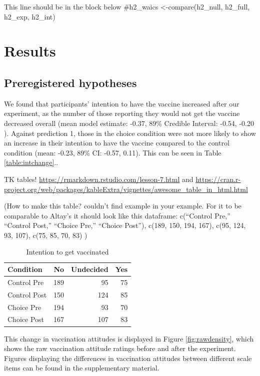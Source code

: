 \documentclass[
  english,
  ,jou,floatsintext]{apa6}
\begin{document}
This line should be in the block below \#h2\_waics \textless-compare(h2\_null, h2\_full, h2\_exp, h2\_int)

\hypertarget{results}{%
\section{Results}\label{results}}

\hypertarget{preregistered-hypotheses-1}{%
\subsection{Preregistered hypotheses}\label{preregistered-hypotheses-1}}

We found that participants' intention to have the vaccine increased after our experiment, as the number of those reporting they would not get the vaccine decreased overall (mean model estimate: -0.37, 89\% Credible Interval: -0.54, -0.20 ). Against prediction 1, those in the choice condition were not more likely to show an increase in their intention to have the vaccine compared to the control condition (mean: -0.23, 89\% CI: -0.57, 0.11). This can be seen in Table \ref{table:intchange}..

TK tables! \url{https://rmarkdown.rstudio.com/lesson-7.html} and \url{https://cran.r-project.org/web/packages/kableExtra/vignettes/awesome_table_in_html.html}

(How to make this table? couldn't find example in your example. For it to be comparable to Altay's it should look like this dataframe: c(``Control Pre,'' ``Control Post,'' ``Choice Pre,'' ``Choice Post''), c(189, 150, 194, 167), c(95, 124, 93, 107), c(75, 85, 70, 83) )

\begin{table}

\caption{\label{tab:intchange}Intention to get vaccinated}
\centering
\begin{tabular}[t]{l|r|r|r}
\hline
Condition & No & Undecided & Yes\\
\hline
Control Pre & 189 & 95 & 75\\
\hline
Control Post & 150 & 124 & 85\\
\hline
Choice Pre & 194 & 93 & 70\\
\hline
Choice Post & 167 & 107 & 83\\
\hline
\end{tabular}
\end{table}

This change in vaccination attitudes is displayed in Figure \ref{fig:rawdensity}, which shows the raw vaccination attitude ratings before and after the experiment. Figures displaying the differences in vaccination attitudes between different scale items can be found in the supplementary material.
\end{document}
